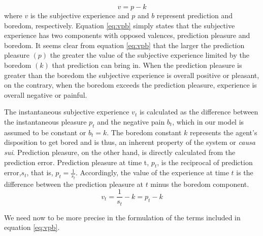 \documentclass[11pt,twocolumn]{article}
\begin{document}
\begin{equation}
    v =  p - k
\label{eq:vpb}
\end{equation}
where $v$ is the subjective experience and $p$ and $b$ represent prediction and boredom, respectively. 
Equation \ref{eq:vpb} simply states that the subjective experience has two components with opposed valences, prediction pleasure and boredom. It seems clear from equation  \ref{eq:vpb} that the larger the prediction pleasure $(p)$ the greater the value of the subjective experience limited by the boredom $(k)$ that prediction can bring in.  
When the prediction pleasure is greater than the boredom the subjective experience is overall positive or pleasant, on the contrary, when the boredom exceeds the prediction pleasure, experience is overall negative or painful. 

The instantaneous subjective experience $v_t$ is calculated as the difference between the instantaneous pleasure $p_t$ and the negative pain $b_t$, which in our model is assumed to be constant or $b_t=k$. The boredom constant $k$ represents the agent's disposition to get bored and is thus, an inherent property of the system or \emph{causa sui}. Prediction pleasure, on the other hand, is directly calculated from the prediction error.
Prediction pleasure at time t, $p_t$, is the reciprocal of prediction error,$s_t$, that is, $p_t = \frac{1}{s_t}$.
Accordingly, the value of the experience at time $t$ is the difference between the prediction pleasure at $t$ minus the boredom component.
\begin{equation}
    v_t = \frac{1}{s_t} -k = p_t - k
\label{eq:vpbt}
\end{equation}

We need now to be more precise in the formulation of the terms included in equation \ref{eq:vpb}. 
\end{document}
